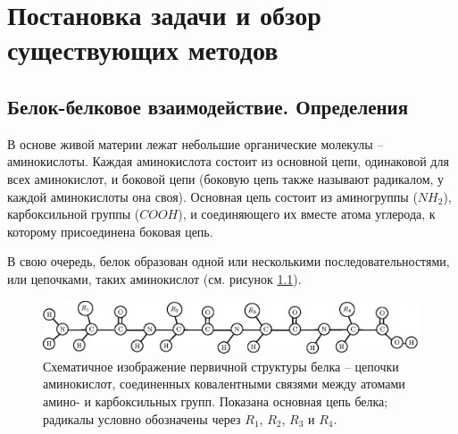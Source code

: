 \graphicspath{{../images/intro/}}
\chapter{Постановка задачи и обзор существующих методов}




\section{Белок-белковое взаимодействие. Определения}

В основе живой материи лежат небольшие органические молекулы -- аминокислоты. Каждая аминокислота состоит из основной цепи, одинаковой для всех аминокислот, и боковой цепи (боковую цепь также называют радикалом, у каждой аминокислоты она своя). Основная цепь состоит из аминогруппы ($NH_2$), карбоксильной группы ($COOH$), и соединяющего их вместе атома углерода, к которому присоединена боковая цепь. 

В свою очередь, белок образован одной или несколькими последовательностями, или цепочками, таких аминокислот (см. рисунок \ref{fig:aa3_1}).

\begin{figure}[h]
%
\includegraphics[width=\linewidth]{aa3_1.eps}
\caption{\small{Схематичное изображение первичной структуры белка -- цепочки аминокислот, соединенных ковалентными связями между атомами амино- и карбоксильных групп. Показана основная цепь белка; радикалы  условно обозначены через $R_1$, $R_2$, $R_3$ и $R_4$. }}
\label{fig:aa3_1}
\end{figure}

